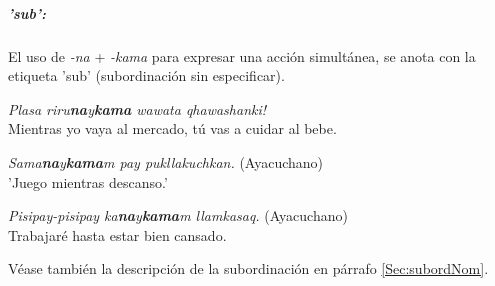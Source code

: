 \documentclass[a4paper,11pt,DIV12]{scrartcl}
\begin{document}
\subparagraph{'sub':}\label{Sec:kamasub}
El uso de {\em -na} + {\em -kama} para expresar una acci\'on simult\'anea, se anota con la etiqueta 'sub' (subordinaci\'on sin especificar).

\begin{examples}
\item {\em Plasa riru\textbf{na}y\textbf{kama} wawata qhawashanki!}\\
      Mientras yo vaya al mercado, t\'u vas a cuidar al bebe.\\
  	 \hfill{\small \citep[129]{Cusi2}}
\item {\em Sama\textbf{na}y\textbf{kama}m pay pukllakuchkan.} (Ayacuchano)\\
      'Juego mientras descanso.'
\item {\em Pisipay-pisipay ka\textbf{na}y\textbf{kama}m llamkasaq.} (Ayacuchano)\\
      Trabajar\'e hasta estar bien cansado.\\
     	        \hfill{\small \citep[81]{Soto76a}}
\end{examples}

V\'ease tambi\'en la descripci\'on de la subordinaci\'on en p\'arrafo \ref{Sec:subordNom}.

% 
% 
% 
\end{document}
